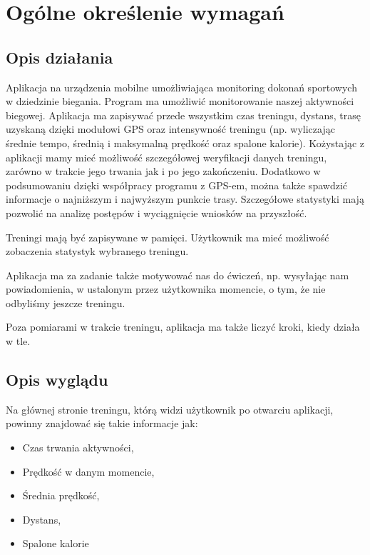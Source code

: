 	\newpage
\section{Ogólne określenie wymagań}		%




\subsection{Opis działania}  %

\hspace{0.60cm}Aplikacja na urządzenia mobilne umożliwiająca monitoring dokonań sportowych w dziedzinie biegania. Program ma umożliwić monitorowanie naszej aktywności biegowej. Aplikacja ma zapisywać przede wszystkim czas treningu, dystans, trasę uzyskaną dzięki modułowi GPS oraz intensywność treningu (np. wyliczając średnie tempo, średnią i maksymalną prędkość oraz spalone kalorie). Kożystając z aplikacji mamy mieć możliwość szczegółowej weryfikacji danych treningu, zarówno w trakcie jego trwania jak i po jego zakończeniu. Dodatkowo w podsumowaniu dzięki współpracy programu z GPS-em, można także spawdzić informacje o najniższym i najwyższym punkcie trasy. Szczegółowe statystyki mają pozwolić na analizę postępów i wyciągnięcie wniosków na przyszłość.

Treningi mają być zapisywane w pamięci. Użytkownik ma mieć możliwość zobaczenia statystyk wybranego treningu.

Aplikacja ma za zadanie także motywować nas do ćwiczeń, np. wysyłając nam powiadomienia, w ustalonym przez użytkownika momencie, o tym, że nie odbyliśmy jeszcze treningu.

Poza pomiarami w trakcie treningu, aplikacja ma także liczyć kroki, kiedy działa w tle.






\subsection{Opis wyglądu}  %


\hspace{0.60cm}Na głównej stronie treningu, którą widzi użytkownik po otwarciu aplikacji, powinny znajdować się takie informacje jak:
\begin{itemize}
	\item Czas trwania aktywności,
	\item Prędkość w danym momencie,
	\item Średnia prędkość,
	\item Dystans,
	\item Spalone kalorie
\end{itemize}

